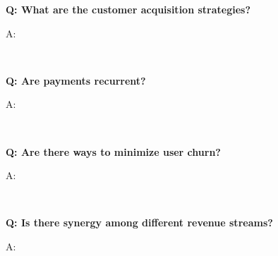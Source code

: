 \documentclass[12pt,a4paper]{article}
\newenvironment{question}[1]{%
  \vspace{0.8em}\noindent\textbf{Q: #1}\par
  \vspace{0.2em}\noindent\begin{itshape}A:\end{itshape}~%
}{\vspace{0.8em}}
\begin{document}
\begin{question}{What are the customer acquisition strategies?}
\end{question}

\begin{question}{Are payments recurrent?}
\end{question}

\begin{question}{Are there ways to minimize user churn?}
\end{question}

\begin{question}{Is there synergy among different revenue streams?}
\end{question}
\end{document}
